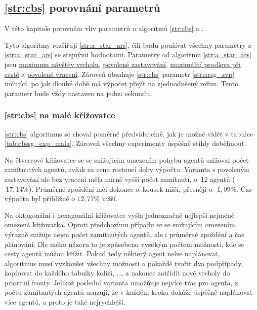 \subsection{\ref{str:cbs} porovnání parametrů}\label{subsec:cbs_porovnani_parametru}

V této kapitole porovnám vliv parametrů u algoritmů \ref{str:cbs} a .

Tyto algoritmy rozšiřují \ref{str:a_star_ars},
čili budu používat všechny parametry z \ref{str:a_star_ars} se stejnými hodnotami.
Parametry od algoritmu \ref{str:a_star_ars} jsou \hyperref[par:ars_mnv]{maximum návštěv vrcholu},
\hyperref[par:ars_pz]{povolené zastavování}, \hyperref[par:ars_mpc]{maximální prodleva při cestě} a
\hyperref[par:ars_pv]{povolené vracení}.
Zároveň obsahuje \ref{str:cbs} parametr \ref{str:arsg_zvp} určující,
po jak dlouhé době má výpočet přejít na zjednodušený režim.
Tento parametr bude vždy nastaven na jednu sekundu.

\subsubsection{\ref{str:cbs} na \hyperref[par:data_mala]{malé} křižovatce}
\label{subsubsec:exp_cbssg_mala_krizovatka}

\ref{str:cbs} algoritmus se choval poměrně předvídatelně, jak je možné vidět v tabulce \ref{tab:cbssg_exp_mala}.
Zároveň všechny experimenty úspěšně stihly doběhnout.

Na čtvercové křižovatce se se snižujícím omezením pohybu agentů snižoval počet zamítnutých agentů,
avšak za cenu rostoucí doby výpočtu.
Varianta s povoleným zastavování ale bez vracení měla mírně vyšší počet zamítnutí, o~12 agentů ($~17,14\%$).
Průměrné zpoždění měl dokonce o~kousek nižší, přesněji o~$~1,09\%$.
Čas výpočtu byl přibližně o $12,77\%$ nižší.

Na oktagonální i hexagonální křižovatce vyšla jednoznačně nejlepší nejméně omezená křižovatka.
Oproti předchozímu případu se se snižujícím omezením výrazně snižuje nejen počet zamítnutých agentů,
ale i průměrné zpoždění a čas plánování.
Dle mého názoru to je způsobeno vysokým počtem možností, kde se cesty agentů můžou křížit.
Pokud tedy některý agent nelze naplánovat, algoritmus musí vyzkoušet všechny možnosti
a pokaždé tvořit dva podpřípady, kopírovat do každého tabulky kolizí, \dots,
a nakonec zatřídit nové vrcholy do prioritní fronty.
Jelikož poslední varianta umožňuje nejvíce tras pro agenta, z počtu zamítnutých agentů usuzuji,
že v každém kroku dokáže úspěšně naplánovat více agentů, a proto je také nejrychlejší.


